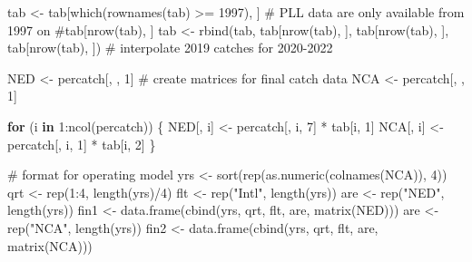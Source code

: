 \documentclass[
]{article}
\newenvironment{Shaded}{\begin{snugshade}}{\end{snugshade}}
\newcommand{\CommentTok}[1]{\textcolor[rgb]{0.37,0.37,0.37}{#1}}
\newcommand{\ControlFlowTok}[1]{\textcolor[rgb]{0.00,0.23,0.31}{\textbf{#1}}}
\newcommand{\DecValTok}[1]{\textcolor[rgb]{0.68,0.00,0.00}{#1}}
\newcommand{\FunctionTok}[1]{\textcolor[rgb]{0.28,0.35,0.67}{#1}}
\newcommand{\NormalTok}[1]{\textcolor[rgb]{0.00,0.23,0.31}{#1}}
\newcommand{\OtherTok}[1]{\textcolor[rgb]{0.00,0.23,0.31}{#1}}
\newcommand{\SpecialCharTok}[1]{\textcolor[rgb]{0.37,0.37,0.37}{#1}}
\newcommand{\StringTok}[1]{\textcolor[rgb]{0.13,0.47,0.30}{#1}}
\begin{document}
\begin{Shaded}
\begin{Highlighting}[]
\NormalTok{tab }\OtherTok{\textless{}{-}}\NormalTok{ tab[}\FunctionTok{which}\NormalTok{(}\FunctionTok{rownames}\NormalTok{(tab) }\SpecialCharTok{\textgreater{}=} \DecValTok{1997}\NormalTok{), ]  }\CommentTok{\# PLL data are only available from 1997 on }
\CommentTok{\#tab[nrow(tab), ]}
\NormalTok{tab }\OtherTok{\textless{}{-}} \FunctionTok{rbind}\NormalTok{(tab, tab[}\FunctionTok{nrow}\NormalTok{(tab), ], tab[}\FunctionTok{nrow}\NormalTok{(tab), ], tab[}\FunctionTok{nrow}\NormalTok{(tab), ])  }\CommentTok{\# interpolate 2019 catches for 2020{-}2022}

\NormalTok{NED }\OtherTok{\textless{}{-}}\NormalTok{ percatch[, , }\DecValTok{1}\NormalTok{]   }\CommentTok{\# create matrices for final catch data}
\NormalTok{NCA }\OtherTok{\textless{}{-}}\NormalTok{ percatch[, , }\DecValTok{1}\NormalTok{]}

\ControlFlowTok{for}\NormalTok{ (i }\ControlFlowTok{in} \DecValTok{1}\SpecialCharTok{:}\FunctionTok{ncol}\NormalTok{(percatch))  \{ }
\NormalTok{  NED[, i] }\OtherTok{\textless{}{-}}\NormalTok{ percatch[, i, }\DecValTok{7}\NormalTok{] }\SpecialCharTok{*}\NormalTok{ tab[i, }\DecValTok{1}\NormalTok{]}
\NormalTok{  NCA[, i] }\OtherTok{\textless{}{-}}\NormalTok{ percatch[, i, }\DecValTok{1}\NormalTok{] }\SpecialCharTok{*}\NormalTok{ tab[i, }\DecValTok{2}\NormalTok{]}
\NormalTok{  \}}

\CommentTok{\# format for operating model}
\NormalTok{yrs }\OtherTok{\textless{}{-}} \FunctionTok{sort}\NormalTok{(}\FunctionTok{rep}\NormalTok{(}\FunctionTok{as.numeric}\NormalTok{(}\FunctionTok{colnames}\NormalTok{(NCA)), }\DecValTok{4}\NormalTok{))}
\NormalTok{qrt }\OtherTok{\textless{}{-}} \FunctionTok{rep}\NormalTok{(}\DecValTok{1}\SpecialCharTok{:}\DecValTok{4}\NormalTok{, }\FunctionTok{length}\NormalTok{(yrs)}\SpecialCharTok{/}\DecValTok{4}\NormalTok{)}
\NormalTok{flt }\OtherTok{\textless{}{-}} \FunctionTok{rep}\NormalTok{(}\StringTok{"Intl"}\NormalTok{, }\FunctionTok{length}\NormalTok{(yrs))}
\NormalTok{are }\OtherTok{\textless{}{-}} \FunctionTok{rep}\NormalTok{(}\StringTok{"NED"}\NormalTok{, }\FunctionTok{length}\NormalTok{(yrs))}
\NormalTok{fin1 }\OtherTok{\textless{}{-}} \FunctionTok{data.frame}\NormalTok{(}\FunctionTok{cbind}\NormalTok{(yrs, qrt, flt, are, }\FunctionTok{matrix}\NormalTok{(NED)))}
\NormalTok{are }\OtherTok{\textless{}{-}} \FunctionTok{rep}\NormalTok{(}\StringTok{"NCA"}\NormalTok{, }\FunctionTok{length}\NormalTok{(yrs))}
\NormalTok{fin2 }\OtherTok{\textless{}{-}} \FunctionTok{data.frame}\NormalTok{(}\FunctionTok{cbind}\NormalTok{(yrs, qrt, flt, are, }\FunctionTok{matrix}\NormalTok{(NCA)))}


\end{Highlighting}
\end{Shaded}
\end{document}
